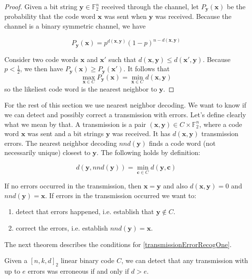 \begin{proof}
Given a bit string $\bm{y} \in \mathbb{F}_2^n$ received through the channel, let $P_{\bm{y}}(\bm{x})$ be the probability that the code word $\bm{x}$ was sent when $\bm{y}$ was received. Because the channel is a binary symmetric channel, we have

$$
P_{\bm{y}}(\bm{x}) = p^{d(\bm{x}, \bm{y})} (1 - p)^{n - d(\bm{x}, \bm{y})}
$$

Consider two code words $\bm{x}$ and $\bm{x'}$ such that $d(\bm{x}, \bm{y}) \leq d(\bm{x'}, \bm{y})$. Because $p < \frac{1}{2}$, we then have $P_{\bm{y}}(\bm{x}) \geq P_{\bm{y}}(\bm{x'})$. It follows that
$$
\max_{\bm{x} \in C} P_{\bm{y}}(\bm{x}) = \min_{\bm{x} \in C} d(\bm{x}, \bm{y})
$$
so the likeliest code word is the nearest neighbor to $\bm{y}$.
\end{proof}

For the rest of this section we use nearest neighbor decoding. We want to know if we can detect and possibly correct a transmission with errors. Let's define clearly what we mean by that. A transmission is a pair $(\bm{x}, \bm{y}) \in C \times \mathbb{F}_2^n$, where a code word $\bm{x}$ was sent and a bit strings $\bm{y}$ was received. It has $d(\bm{x}, \bm{y})$ transmission errors. The nearest neighbor decoding $nnd(\bm{y})$ finds a code word (not necessarily unique) closest to $\bm{y}$. The following holds by definition:

$$
d(\bm{y}, nnd(\bm{y})) = \min_{\bm{c} \in C} d(\bm{y}, \bm{c})
$$

If no errors occurred in the transmission, then $\bm{x} = \bm{y}$ and also $d(\bm{x}, \bm{y}) = 0$ and $nnd(\bm{y}) = \bm{x}$. If errors in the transmission occurred we want to:

\begin{enumerate}[label=\textbf{E.\arabic*}]
\item \label{transmissionErrorRecogOne} detect that errors happened, i.e. establish that $\bm{y} \notin C$.
\item \label{transmissionErrorRecogTwo} correct the errors, i.e. establish $nnd(\bm{y}) = \bm{x}$.
\end{enumerate}

The next theorem describes the conditions for \ref{transmissionErrorRecogOne}.

\begin{thm}\label{linearCodeDetectErrors}
Given a $[n, k, d]_2$ linear binary code $C$, we can detect that any transmission with up to $e$ errors was erroneous if and only if $d > e$.
\end{thm}

